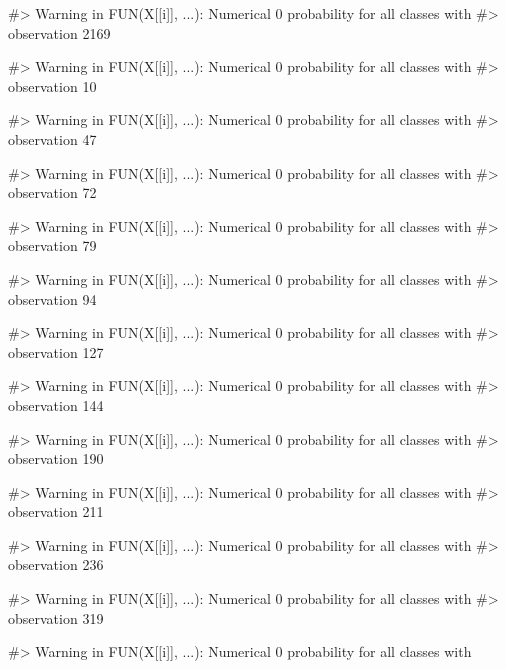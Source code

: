 \begin{Schunk}
\begin{Soutput}
#> Warning in FUN(X[[i]], ...): Numerical 0 probability for all classes with
#> observation 2169
\end{Soutput}
\begin{Soutput}
#> Warning in FUN(X[[i]], ...): Numerical 0 probability for all classes with
#> observation 10
\end{Soutput}
\begin{Soutput}
#> Warning in FUN(X[[i]], ...): Numerical 0 probability for all classes with
#> observation 47
\end{Soutput}
\begin{Soutput}
#> Warning in FUN(X[[i]], ...): Numerical 0 probability for all classes with
#> observation 72
\end{Soutput}
\begin{Soutput}
#> Warning in FUN(X[[i]], ...): Numerical 0 probability for all classes with
#> observation 79
\end{Soutput}
\begin{Soutput}
#> Warning in FUN(X[[i]], ...): Numerical 0 probability for all classes with
#> observation 94
\end{Soutput}
\begin{Soutput}
#> Warning in FUN(X[[i]], ...): Numerical 0 probability for all classes with
#> observation 127
\end{Soutput}
\begin{Soutput}
#> Warning in FUN(X[[i]], ...): Numerical 0 probability for all classes with
#> observation 144
\end{Soutput}
\begin{Soutput}
#> Warning in FUN(X[[i]], ...): Numerical 0 probability for all classes with
#> observation 190
\end{Soutput}
\begin{Soutput}
#> Warning in FUN(X[[i]], ...): Numerical 0 probability for all classes with
#> observation 211
\end{Soutput}
\begin{Soutput}
#> Warning in FUN(X[[i]], ...): Numerical 0 probability for all classes with
#> observation 236
\end{Soutput}
\begin{Soutput}
#> Warning in FUN(X[[i]], ...): Numerical 0 probability for all classes with
#> observation 319
\end{Soutput}
\begin{Soutput}
#> Warning in FUN(X[[i]], ...): Numerical 0 probability for all classes with

\end{Soutput}
\end{Schunk}
